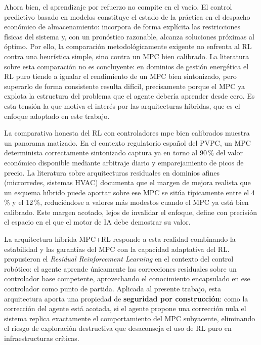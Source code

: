 \documentclass[12pt, a4paper, twoside]{report}
\begin{document}
Ahora bien, el aprendizaje por refuerzo no compite en el vacío. El control
predictivo basado en modelos \citep{Rawlings2017} constituye el estado de la
práctica en el despacho económico de almacenamiento: incorpora de forma
explícita las restricciones físicas del sistema y, con un pronóstico razonable,
alcanza soluciones próximas al óptimo. Por ello, la comparación
metodológicamente exigente no enfrenta al RL contra una heurística simple, sino
contra un MPC bien calibrado. La literatura sobre esta comparación no es
concluyente: en dominios de gestión energética el RL puro tiende a igualar el
rendimiento de un MPC bien sintonizado, pero superarlo de forma consistente
resulta difícil, precisamente porque el MPC ya explota la estructura del
problema que el agente debería aprender desde cero. Es esta tensión la que
motiva el interés por las arquitecturas híbridas, que es el enfoque adoptado en
este trabajo.

La comparativa honesta del RL con controladores \acrshort{mpc} bien calibrados
muestra un panorama matizado. En el contexto regulatorio español del PVPC, un
MPC determinista correctamente sintonizado captura ya en torno al 90\,\% del
valor económico disponible mediante arbitraje diario y emparejamiento de picos
de precio. La literatura sobre arquitecturas residuales en dominios afines
(microrredes, sistemas HVAC) documenta que el margen de mejora realista que un
esquema híbrido puede aportar sobre ese MPC se sitúa típicamente entre el 4\,\%
y el 12\,\%, reduciéndose a valores más modestos cuando el MPC ya está bien
calibrado. Este margen acotado, lejos de invalidar el enfoque, define con
precisión el espacio en el que el motor de IA debe demostrar su valor.

La arquitectura híbrida MPC+RL responde a esta realidad combinando la
estabilidad y las garantías del MPC con la capacidad adaptativa del RL.
\citet{Johannink2019} propusieron el \textit{Residual Reinforcement Learning}
en el contexto del control robótico: el agente aprende únicamente las
correcciones residuales sobre un controlador base competente, aprovechando el
conocimiento encapsulado en ese controlador como punto de partida. Aplicada al
presente trabajo, esta arquitectura aporta una propiedad de \textbf{seguridad
por construcción}: como la corrección del agente está acotada, si el agente
propone una corrección nula el sistema replica exactamente el comportamiento
del MPC subyacente, eliminando el riesgo de exploración destructiva que
desaconseja el uso de RL puro en infraestructuras críticas.
\end{document}
